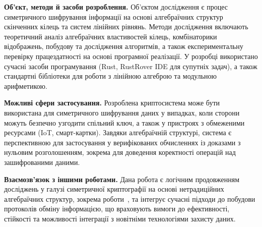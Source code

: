 \textbf{Об’єкт, методи й засоби розроблення.}
Об’єктом дослідження є процес симетричного шифрування інформації на основі алгебраїчних структур скінченних кілець та систем лінійних рівнянь.
Методи дослідження включають теоретичний аналіз алгебраїчних властивостей кілець, комбінаторики відображень, побудову та дослідження алгоритмів, а також експериментальну перевірку працездатності на основі програмної реалізації.
У розробці використано сучасні засоби програмування (Rust, RustRover IDE для супутніх задач), а також стандартні бібліотеки для роботи з лінійною алгеброю та модульною арифметикою.

\textbf{Можливі сфери застосування.}
Розроблена криптосистема може бути використана для симетричного шифрування даних у випадках, коли сторони можуть безпечно узгодити спільний ключ, а також у пристроях з обмеженими ресурсами (IoT, смарт-картки).
Завдяки алгебраїчній структурі, система є перспективною для застосування у верифікованих обчисленнях із доказами з нульовим розголошенням, зокрема для доведення коректності операцій над зашифрованими даними.

\textbf{Взаємозв’язок з іншими роботами.}
Дана робота є логічним продовженням досліджень у галузі симетричної криптографії на основі нетрадиційних алгебраїчних структур, зокрема роботи~\cite{5}, та інтегрує сучасні підходи до побудови протоколів обміну інформацією, що враховують вимоги до ефективності, стійкості та можливості інтеграції з новітніми технологіями захисту даних.
